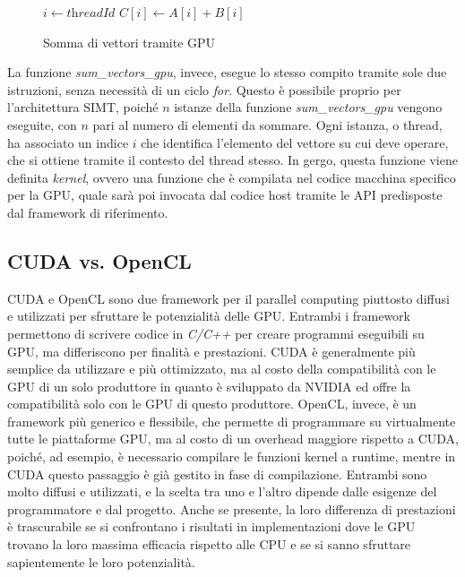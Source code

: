 \begin{figure}[h!]
  \vspace{1em}
  \begin{algorithm}
    [H]
    \caption{Somma di vettori tramite GPU}
    \label{alg:sumvectorsgpu}
    \begin{algorithmic}
       \State $i \gets \textit{threadId}$ \State
      $C[i] \gets A[i] + B[i]$ \EndFunction
    \end{algorithmic}
  \end{algorithm}
  \vspace{1em}
\end{figure}

La funzione \textit{sum\_vectors\_gpu}, invece, esegue lo stesso compito tramite
sole due istruzioni, senza necessità di un ciclo \textit{for}. Questo è
possibile proprio per l'architettura SIMT, poiché $n$ istanze della funzione \textit{sum\_vectors\_gpu}
vengono eseguite, con $n$ pari al numero di elementi da sommare. Ogni istanza, o
thread, ha associato un indice $i$ che identifica l'elemento del vettore su cui
deve operare, che si ottiene tramite il contesto del thread stesso. In gergo, questa
funzione viene definita \textit{kernel}, ovvero una funzione che è compilata nel
codice macchina specifico per la GPU, quale sarà poi invocata dal codice host
tramite le API predisposte dal framework di riferimento.

\subsection{CUDA vs. OpenCL}
\label{subsec:cudavsopencl}

CUDA e OpenCL sono due framework per il parallel computing piuttosto diffusi e utilizzati
per sfruttare le potenzialità delle GPU. Entrambi i framework permettono di
scrivere codice in \textit{C/C++} per creare programmi eseguibili su GPU, ma
differiscono per finalità e prestazioni. CUDA è generalmente più semplice da utilizzare
e più ottimizzato, ma al costo della compatibilità con le GPU di un solo
produttore in quanto è sviluppato da NVIDIA ed offre la compatibilità solo con
le GPU di questo produttore. OpenCL, invece, è un framework più generico e flessibile,
che permette di programmare su virtualmente tutte le piattaforme GPU, ma al costo
di un overhead maggiore rispetto a CUDA, poiché, ad esempio, è necessario
compilare le funzioni kernel a runtime, mentre in CUDA questo passaggio è già gestito
in fase di compilazione. Entrambi sono molto diffusi e utilizzati, e la scelta tra
uno e l'altro dipende dalle esigenze del programmatore e dal progetto. Anche se
presente, la loro differenza di prestazioni è trascurabile se si confrontano i risultati
in implementazioni dove le GPU trovano la loro massima efficacia rispetto alle CPU
e se si sanno sfruttare sapientemente le loro potenzialità.

